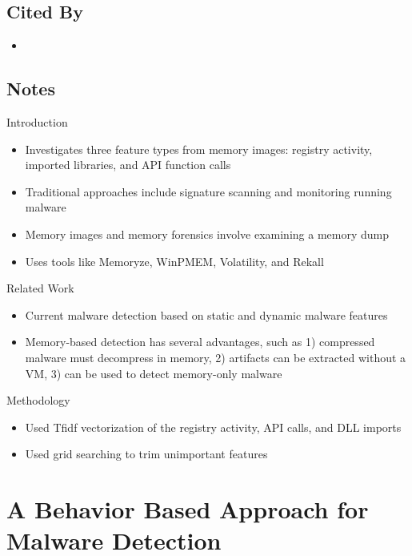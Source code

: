 \documentclass{article}
\begin{document}
\subsection*{Cited By}
\begin{itemize}
\item
\end{itemize}

\subsection*{Notes}

\noindent Introduction
\begin{itemize}
	\item Investigates three feature types from memory images: registry activity, imported libraries, and API function calls
	\item Traditional approaches include signature scanning and monitoring running malware
	\item Memory images and memory forensics involve examining a memory dump
	\item Uses tools like Memoryze, WinPMEM, Volatility, and Rekall
\end{itemize}

\noindent Related Work
\begin{itemize}
	\item Current malware detection based on static and dynamic malware features
	\item Memory-based detection has several advantages, such as 1) compressed malware must decompress in memory, 2) artifacts can be extracted without a VM, 3) can be used to detect memory-only malware
\end{itemize}

\noindent Methodology
\begin{itemize}
	\item Used Tfidf vectorization of the registry activity, API calls, and DLL imports
	\item Used grid searching to trim unimportant features
\end{itemize}

\pagebreak


\section*{A Behavior Based Approach for Malware Detection}
\end{document}
